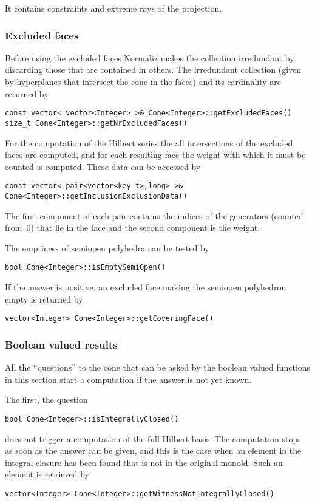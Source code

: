 \documentclass[12pt,a4paper]{scrartcl}
\theoremstyle{definition}
\begin{document}
\begin{small}
It contains constraints and extreme rays of the projection.

\subsubsection{Excluded faces}

Before using the excluded faces Normaliz makes the collection irredundant by discarding those that are contained in others. The irredundant collection (given by hyperplanes that intersect the cone in the faces) and its cardinality are returned by
\begin{Verbatim}
const vector< vector<Integer> >& Cone<Integer>::getExcludedFaces()
size_t Cone<Integer>::getNrExcludedFaces()
\end{Verbatim}
For the computation of the Hilbert series the all intersections of the excluded faces are computed, and for each resulting face the weight with which it must be counted is computed. These data can be accessed by
\begin{Verbatim}
const vector< pair<vector<key_t>,long> >& Cone<Integer>::getInclusionExclusionData()
\end{Verbatim}
The first component of each pair contains the indices of the generators (counted from~$0$) that lie in the face and the second component is the weight.

The emptiness of semiopen polyhedra can be tested by
\begin{Verbatim}
bool Cone<Integer>::isEmptySemiOpen()
\end{Verbatim}
If the answer is positive, an excluded face making the semiopen polyhedron empty is returned by
\begin{Verbatim}
vector<Integer> Cone<Integer>::getCoveringFace() 
\end{Verbatim}

\subsubsection{Boolean valued results}

All the ``questions'' to the cone that can be asked by the boolean valued functions in this section start a computation if the answer is not yet known.

The first, the question
\begin{Verbatim}
bool Cone<Integer>::isIntegrallyClosed()
\end{Verbatim}
does not trigger a computation of the full Hilbert basis. The computation stops as soon as the answer can be given, and this is the case when an element in the integral closure has been found that is not in the original monoid. Such an element is retrieved by
\begin{Verbatim}
vector<Integer> Cone<Integer>::getWitnessNotIntegrallyClosed()
\end{Verbatim}


\end{small}
\end{document}
